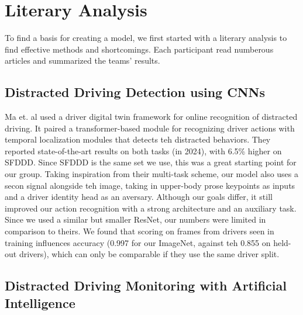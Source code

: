\section{Literary Analysis}
\label{sec:related work}

To find a basis for creating a model, we first started with a literary analysis to find effective methods and shortcomings. 
Each participant read numberous articles and summarized the teams' results.
\subsection{Distracted Driving Detection using CNNs}

Ma et. al\cite{maDigitalTwin2024} used a driver digital twin framework for online recognition of distracted driving.
It paired a transformer-based module for recognizing driver actions with temporal localization modules that detects teh distracted behaviors.
They reported state-of-the-art results on both tasks (in 2024), with 6.5\% higher on SFDDD.
Since SFDDD is the same set we use, this was a great starting point for our group.
Taking inspiration from their multi-task scheme, our model also uses a secon signal alongside teh image, taking in upper-body prose keypoints as inputs and a driver identity head as an aversary.
Although our goals differ, it still improved our action recognition with a strong architecture and an auxiliary task.
Since we used a similar but smaller ResNet, our numbers were limited in comparison to theirs.
We found that scoring on frames from drivers seen in training influences accuracy (0.997 for our ImageNet, against teh 0.855 on held-out drivers), which can only be comparable if they use the same driver split.

\subsection{Distracted Driving Monitoring with Artificial Intelligence}

